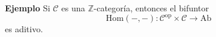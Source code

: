 \documentclass[preview]{standalone}
\begin{document}
\begin{center}
\flushleft \textbf{Ejemplo} Si $\mathscr{C}$ es una $\mathbb{Z}$-categoría, entonces el bifuntor $$\text{Hom}(-,-):\mathscr{C}^\text{op}\times\mathscr{C}\to\text{Ab}$$ es aditivo.
\end{center}
\end{document}
